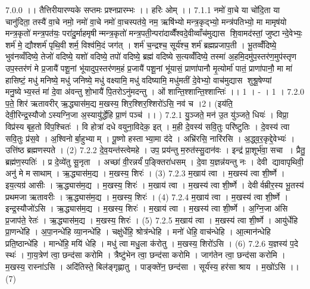 7.0.0
।। तैत्तिरीयारण्यके सप्तमः प्रश्नप्रारम्भः ।। हरिः ओम् ।।
7.1.1
नमो॑ वा॒चे या चो॑दि॒ता या चानु॑दिता॒ तस्यै॑ वा॒चे नमो॒ नमो॑ वा॒चे नमो॑ वा॒चस्पत॑ये॒ नम॒ ऋषि॑भ्यो मन्त्र॒कृद्भ्यो॒ मन्त्र॑पतिभ्यो॒ मा मामृष॑यो मन्त्र॒कृतो॑ मन्त्र॒पत॑यः॒ परा॑दु॒र्माहमृषीन्मन्त्र॒कृतो॑ मन्त्र॒पती॒न्परा॑दाव्वैँश्वदे॒वीव्वाँच॑मुद्यास शि॒वामद॑स्तां॒ जुष्टान्दे॒वेभ्यः॒ शर्म॑ मे॒ द्यौश्शर्म॑ पृथि॒वी शर्म॒ विश्व॑मि॒दं जग॑त् । शर्म॑ च॒न्द्रश्च॒ सूर्य॑श्च॒ शर्म॑ ब्रह्मप्रजाप॒ती । भू॒तव्वँ॑दिष्ये॒ भुव॑नव्वँदिष्ये॒ तेजो॑ वदिष्ये॒ यशो॑ वदिष्ये॒ तपो॑ वदिष्ये॒ ब्रह्म॑ वदिष्ये स॒त्यव्वँ॑दिष्ये॒ तस्मा॑ अ॒हमि॒दमु॑प॒स्तर॑ण॒मुप॑स्तृण उप॒स्तर॑णं मे प्र॒जायै॑ पशू॒नां भू॑यादुप॒स्तर॑णम॒हं प्र॒जायै॑ पशू॒नां भू॑यासं॒ प्राणा॑पानौ मृ॒त्योर्मा॑ पातं॒ प्राणा॑पानौ॒ मा मा॑ हासिष्टं॒ मधु॑ मनिष्ये॒ मधु॑ जनिष्ये॒ मधु॑ वक्ष्यामि॒ मधु॑ वदिष्यामि॒ मधु॑मतीं दे॒वेभ्यो॒ वाच॑मुद्यास शुश्रू॒षेण्यां मनु॒ष्येभ्य॒स्तं मा॑ दे॒वा अ॑वन्तु शो॒भायै॑ पि॒तरोऽनु॑मदन्तु । ओं शान्ति॒श्शान्ति॒श्शान्तिः॑ ।। 1 । - । 1 ।
7.2.0
प॒ते॒ शिर॑ ऋतावरीर् ऋ॒द्ध्यास॑म॒द्य म॒खस्य॒ शिर॒श्शिर॒श्शिरो॑ऽसि॒ नव॑ च ।2। (इय॑ति॒ देवी॒रिन्द्र॒स्यौजोऽस्यग्नि॒जा अ॒स्यायु॑र्द्धेहि प्रा॒णं पञ्च॑ ।। )
7.2.1
यु॒ञ्जते॒ मन॑ उ॒त यु॑ञ्जते॒ धियः॑ । विप्रा॒ विप्र॑स्य बृह॒तो वि॑प॒श्चितः॑ । वि होत्रा॑ दधे वयुना॒विदेक॒ इत् । म॒ही दे॒वस्य॑ सवि॒तुः परि॑ष्टुतिः । दे॒वस्य॑ त्वा सवि॒तुः प्र॑स॒वे । अ॒श्विनोर्बा॒हुभ्याम् । पू॒ष्णो हस्ताभ्या॒मा द॑दे । अभ्रि॑रसि॒ नारि॑रसि । अ॒द्ध्व॒र॒कृद्दे॒वेभ्यः॑ । उत्ति॑ष्ठ ब्रह्मणस्पते । (2)
7.2.2
दे॒व॒यन्त॑स्त्वेमहे । उप॒ प्रय॑न्तु म॒रुत॑स्सु॒दान॑वः । इन्द्र॑ प्रा॒शूर्भ॑वा॒ सचा । प्रैतु॒ ब्रह्म॑ण॒स्पतिः॑ । प्र दे॒व्ये॑तु सू॒नृता । अच्छा॑ वी॒रन्नर्यं॑ प॒ङ्क्तिरा॑धसम् । दे॒वा य॒ज्ञन्न॑यन्तु नः । देवी द्यावापृथिवी॒ अनु॑ मे मसाथाम् । ऋ॒द्ध्यास॑म॒द्य । म॒खस्य॒ शिरः॑ । (3)
7.2.3
म॒खाय॑ त्वा । म॒खस्य॑ त्वा शी॒र्ष्णे । इय॒त्यग्र॑ आसीः । ऋ॒द्ध्यास॑म॒द्य । म॒खस्य॒ शिरः॑ । म॒खाय॑ त्वा । म॒खस्य॑ त्वा शी॒र्ष्णे । देवीर्वम्रीर॒स्य भू॒तस्य॑ प्रथमजा ऋतावरीः । ऋ॒द्ध्यास॑म॒द्य । म॒खस्य॒ शिरः॑ । (4)
7.2.4
म॒खाय॑ त्वा । म॒खस्य॑ त्वा शी॒र्ष्णे । इन्द्र॒स्यौजो॑ऽसि । ऋ॒द्ध्यास॑म॒द्य । म॒खस्य॒ शिरः॑ । म॒खाय॑ त्वा । म॒खस्य॑ त्वा शी॒र्ष्णे । अ॒ग्नि॒जा अ॑सि प्र॒जाप॑ते॒ रेतः॑ । ऋ॒द्ध्यास॑म॒द्य । म॒खस्य॒ शिरः॑ । (5)
7.2.5
म॒खाय॑ त्वा । म॒खस्य॑ त्वा शी॒र्ष्णे । आयु॑र्धेहि प्रा॒णन्धे॑हि । अ॒पा॒नन्धे॑हि व्या॒नन्धे॑हि । चक्षु॑र्धेहि॒ श्रोत्र॑न्धेहि । मनो॑ धेहि॒ वाच॑न्धेहि । आ॒त्मान॑न्धेहि प्रति॒ष्ठान्धे॑हि । मान्धे॑हि॒ मयि॑ धेहि । मधु॑ त्वा मधु॒ला क॑रोतु । म॒खस्य॒ शिरो॑ऽसि । (6)
7.2.6
य॒ज्ञस्य॑ प॒दे स्थः॑ । गा॒य॒त्रेण॑ त्वा॒ छन्द॑सा करोमि । त्रैष्टु॑भेन त्वा॒ छन्द॑सा करोमि । जाग॑तेन त्वा॒ छन्द॑सा करोमि । म॒खस्य॒ रास्ना॑ऽसि । अदि॑तिस्ते॒ बिल॑ङ्गृह्णातु । पाङ्क्ते॑न॒ छन्द॑सा । सूर्य॑स्य॒ हर॑सा श्राय । म॒खो॑ऽसि ।। (7)
